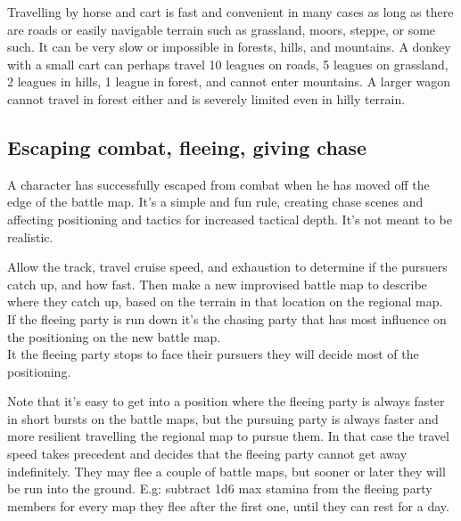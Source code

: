 Travelling by horse and cart is fast and convenient in many cases as long as there are roads or easily navigable terrain such as grassland, moors, steppe, or some such. It can be very slow or impossible in forests, hills, and mountains. A donkey with a small cart can perhaps travel 10 leagues on roads, 5 leagues on grassland, 2 leagues in hills, 1 league in forest, and cannot enter mountains. A larger wagon cannot travel in forest either and is severely limited even in hilly terrain.


%



\subsection*{Escaping combat, fleeing, giving chase}
A character has successfully escaped from combat when he has moved off the edge of the battle map. It's a simple and fun rule, creating chase scenes and affecting positioning and tactics for increased tactical depth. It's not meant to be realistic.

Allow the track, travel cruise speed, and exhaustion to determine if the pursuers catch up, and how fast. Then make a new improvised battle map to describe where they catch up, based on the terrain in that location on the regional map.\\
If the fleeing party is run down it's the chasing party that has most influence on the positioning on the new battle map.\\
It the fleeing party stops to face their pursuers they will decide most of the positioning.

Note that it's easy to get into a position where the fleeing party is always faster in short bursts on the battle maps, but the pursuing party is always faster and more resilient travelling the regional map to pursue them. In that case the travel speed takes precedent and decides that the fleeing party cannot get away indefinitely. They may flee a couple of battle maps, but sooner or later they will be run into the ground. E.g: subtract 1d6 max stamina from the fleeing party members for every map they flee after the first one, until they can rest for a day.

